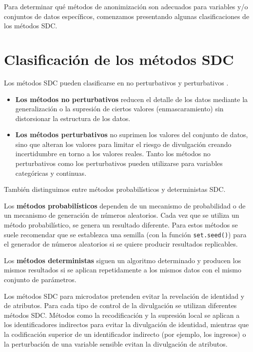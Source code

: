\documentclass[]{book}
\providecommand{\tightlist}{%
  \setlength{\itemsep}{0pt}\setlength{\parskip}{0pt}}
\theoremstyle{definition}
\theoremstyle{definition}
\theoremstyle{definition}
\theoremstyle{definition}
\theoremstyle{remark}
\begin{document}
Para determinar qué métodos de anonimización son adecuados para variables y/o conjuntos de datos específicos, comenzamos presentando algunas clasificaciones de los métodos SDC.

\hypertarget{clasificaciuxf3n-de-los-muxe9todos-sdc}{%
\section{Clasificación de los métodos SDC}\label{clasificaciuxf3n-de-los-muxe9todos-sdc}}

Los métodos SDC pueden clasificarse en no perturbativos y perturbativos \citep{HDFG12}.

\begin{itemize}
\tightlist
\item
  \textbf{Los métodos no perturbativos} reducen el detalle de los datos mediante la generalización o la supresión de ciertos valores (enmascaramiento) sin distorsionar la estructura de los datos.
\item
  \textbf{Los métodos perturbativos} no suprimen los valores del conjunto de datos, sino que alteran los valores para limitar el riesgo de divulgación creando incertidumbre en torno a los valores reales.
  Tanto los métodos no perturbativos como los perturbativos pueden utilizarse para variables categóricas y continuas.
\end{itemize}

También distinguimos entre métodos probabilísticos y deterministas SDC.

Los \textbf{métodos probabilísticos} dependen de un mecanismo de probabilidad o de un mecanismo de generación de números aleatorios. Cada vez que se utiliza un método probabilístico, se genera un resultado diferente. Para estos métodos se suele recomendar que se establezca una semilla (con la función \texttt{set.seed()}) para el generador de números aleatorios si se quiere producir resultados replicables.

Los \textbf{métodos deterministas} siguen un algoritmo determinado y producen los mismos resultados si se aplican repetidamente a los mismos datos con el mismo conjunto de parámetros.

Los métodos SDC para microdatos pretenden evitar la revelación de identidad y de atributos. Para cada tipo de control de la divulgación se utilizan diferentes métodos SDC. Métodos como la recodificación y la supresión local se aplican a los identificadores indirectos para evitar la divulgación de identidad, mientras que la codificación superior de un identificador indirecto (por ejemplo, los ingresos) o la perturbación de una variable sensible evitan la divulgación de atributos.
\end{document}
